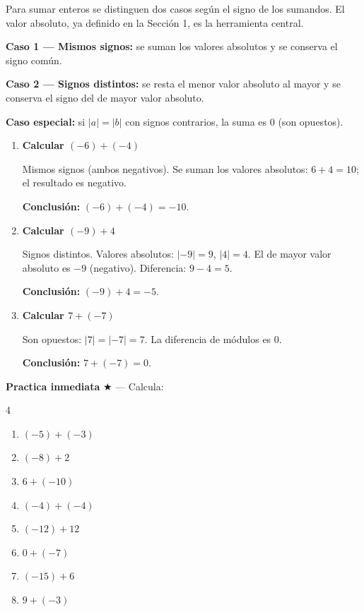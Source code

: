\documentclass[11pt, letterpaper]{article}
\begin{document}
Para sumar enteros se distinguen dos casos seg\'un el signo de los sumandos. El valor absoluto, ya definido en la Secci\'on 1, es la herramienta central.

\begin{tcolorbox}[importantbox, title={Reglas de la adici\'on de enteros}]
\textbf{Caso 1 --- Mismos signos:} se suman los valores absolutos y se conserva el signo com\'un.

\textbf{Caso 2 --- Signos distintos:} se resta el menor valor absoluto al mayor y se conserva el signo del de mayor valor absoluto.

\textbf{Caso especial:} si $|a|=|b|$ con signos contrarios, la suma es $0$ (son opuestos).
\end{tcolorbox}

\begin{tcolorbox}[examplebox, title={Ejemplos --- suma de enteros}]
\begin{enumerate}[label=\textbf{Ej. \arabic*.}, leftmargin=*, itemsep=12pt]

\item \textbf{Calcular $(-6)+(-4)$}

Mismos signos (ambos negativos). Se suman los valores absolutos: $6+4=10$; el resultado es negativo.

\textbf{Conclusi\'on:} $(-6)+(-4)=-10$.

\item \textbf{Calcular $(-9)+4$}

Signos distintos. Valores absolutos: $|-9|=9$, $|4|=4$. El de mayor valor absoluto es $-9$ (negativo). Diferencia: $9-4=5$.

\textbf{Conclusi\'on:} $(-9)+4=-5$.

\item \textbf{Calcular $7+(-7)$}

Son opuestos: $|7|=|-7|=7$. La diferencia de m\'odulos es $0$.

\textbf{Conclusi\'on:} $7+(-7)=0$.

\end{enumerate}
\end{tcolorbox}

\medskip
\textbf{Practica inmediata} \quad $\bigstar$ --- Calcula:
\begin{multicols}{4}
\begin{enumerate}[label=\alph*), leftmargin=*]
  \item $(-5)+(-3)$
  \item $(-8)+2$
  \item $6+(-10)$
  \item $(-4)+(-4)$
  \item $(-12)+12$
  \item $0+(-7)$
  \item $(-15)+6$
  \item $9+(-3)$
\end{enumerate}
\end{multicols}
\end{document}
